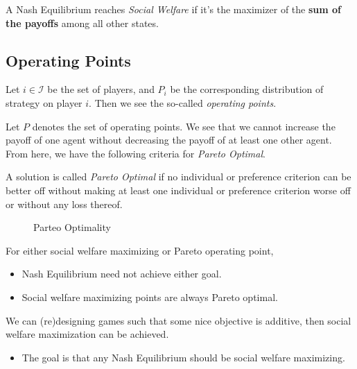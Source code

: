 \begin{definition}
	A Nash Equilibrium reaches \emph{Social Welfare} if it's the maximizer of the \textbf{sum of the payoffs} among all other states.
\end{definition}


\subsection{Operating Points}
Let \(i\in \mathcal{I} \) be the set of players, and \(P_{i}\) be the corresponding distribution of strategy on player \(i\). Then we see the
so-called \emph{operating points}.

\begin{figure}[H]
	\centering
	\label{fig:NE-social-welfare}
\end{figure}

Let \(P\) denotes the set of operating points. We see that we cannot increase the payoff of one agent without decreasing the payoff of at least
one other agent. From here, we have the following criteria for \emph{Pareto Optimal}.

\begin{definition}
	A solution is called \emph{Pareto Optimal} if no individual or preference criterion can be better off without making at least one
	individual or preference criterion worse off or without any loss thereof.
\end{definition}

\begin{figure}[H]
	\centering
	\caption{Parteo Optimality}
	\label{fig:Pareto-Optimal}
\end{figure}

\begin{note}
	For either social welfare maximizing or Pareto operating point,
	\begin{itemize}
		\item Nash Equilibrium need not achieve either goal.
		\item Social welfare maximizing points are always Pareto optimal.
	\end{itemize}
\end{note}

\begin{remark}
	We can (re)designing games such that some nice objective is additive, then social welfare maximization can be achieved.
	\begin{itemize}
		\item The goal is that any Nash Equilibrium should be social welfare maximizing.
	\end{itemize}
\end{remark}

